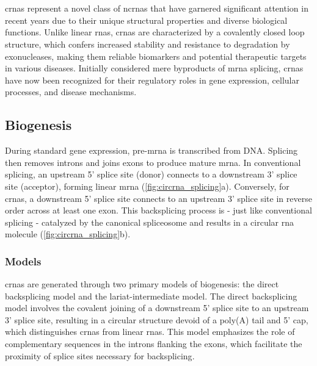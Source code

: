 \section{}
\label{sec:circrnas}

\Glspl{crna} represent a novel class of \glspl{ncrna} that have garnered
significant attention in recent years due to their unique structural properties
and diverse biological functions.
Unlike linear \glspl{rna}, \glspl{crna} are characterized by a covalently
closed loop structure, which confers increased stability and resistance to
degradation by exonucleases, making them reliable biomarkers and potential
therapeutic targets in various
diseases\supercite{ma_circular_2020,hoque_exploring_2023,wilusz_circular_2017}.
Initially considered mere byproducts of \gls{mrna} splicing, \glspl{crna} have
now been recognized for their regulatory roles in gene expression, cellular
processes, and disease
mechanisms\supercite{cherubini_foxp1_2019,wilusz_360_2018}.

\subsection{Biogenesis}
\label{sec:circrna_biogenesis}
During standard gene expression, pre-\gls{mrna} is transcribed from DNA.
Splicing then removes introns and joins exons to produce mature
\gls{mrna}\supercite{black_mechanisms_2003}.
In conventional splicing, an upstream 5' splice site (donor) connects to a
downstream 3' splice site (acceptor), forming linear \gls{mrna}
(\cref{fig:circrna_splicing}a).
Conversely, for \glspl{crna}, a downstream 5' splice site connects to an
upstream 3' splice site in reverse order across at least one
exon\supercite{chen_expanding_2020}.
This backsplicing process is - just like conventional splicing - catalyzed by
the canonical spliceosome\supercite{starke_exon_2015} and results in a circular
\gls{rna} molecule (\cref{fig:circrna_splicing}b).

\subsubsection{Models}

\glspl{crna} are generated through two primary models of
biogenesis: the direct backsplicing model and the lariat-intermediate model.
The direct backsplicing model involves the covalent joining of a downstream 5'
splice site to an upstream 3' splice site, resulting in a circular structure
devoid of a poly(A) tail and 5' cap, which distinguishes \glspl{crna} from
linear \glspl{rna}\supercite{zhang_complementary_2014,ferreira_circular_2018}.
This model emphasizes the role of complementary sequences in the introns
flanking the exons, which facilitate the proximity of splice sites necessary
for backsplicing\supercite{zhang_complementary_2014,meganck_engineering_2021}.

